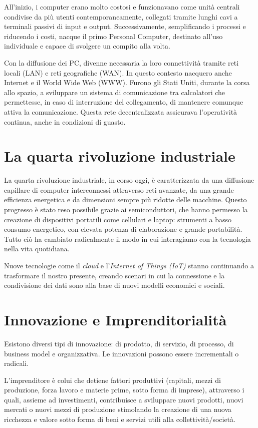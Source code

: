 \documentclass[12pt]{article}
\begin{document}
All’inizio, i computer erano molto costosi e funzionavano come unità centrali condivise da più utenti contemporaneamente, collegati tramite lunghi cavi a terminali passivi di input e output. Successivamente, semplificando i processi e riducendo i costi, nacque il primo Personal Computer, destinato all’uso individuale e capace di svolgere un compito alla volta.

Con la diffusione dei PC, divenne necessaria la loro connettività tramite reti locali (LAN) e reti geografiche (WAN). In questo contesto nacquero anche Internet e il World Wide Web (WWW). Furono gli Stati Uniti, durante la corsa allo spazio, a sviluppare un sistema di comunicazione tra calcolatori che permettesse, in caso di interruzione del collegamento, di mantenere comunque attiva la comunicazione. Questa rete decentralizzata assicurava l’operatività continua, anche in condizioni di guasto.

\section{La quarta rivoluzione industriale}
La quarta rivoluzione industriale, in corso oggi, è caratterizzata da una diffusione capillare di computer interconnessi attraverso reti avanzate, da una grande efficienza energetica e da dimensioni sempre più ridotte delle macchine. Questo progresso è stato reso possibile grazie ai semiconduttori, che hanno permesso la creazione di dispositivi portatili come cellulari e laptop: strumenti a basso consumo energetico, con elevata potenza di elaborazione e grande portabilità. Tutto ciò ha cambiato radicalmente il modo in cui interagiamo con la tecnologia nella vita quotidiana.

Nuove tecnologie come il \emph{cloud} e l’\emph{Internet of Things (IoT)} stanno continuando a trasformare il nostro presente, creando scenari in cui la connessione e la condivisione dei dati sono alla base di nuovi modelli economici e sociali.
\section{Innovazione e Imprenditorialità}

Esistono diversi tipi di innovazione: di prodotto, di servizio, di processo, di business model e organizzativa. Le innovazioni possono essere incrementali o radicali.

L’imprenditore è colui che detiene fattori produttivi (capitali, mezzi di produzione, forza lavoro e materie prime, sotto forma di imprese), attraverso i quali, assieme ad investimenti, contribuisce a sviluppare nuovi prodotti, nuovi mercati o nuovi mezzi di produzione stimolando la creazione di una nuova ricchezza e valore sotto forma di beni e servizi utili alla collettività/società.
\end{document}
